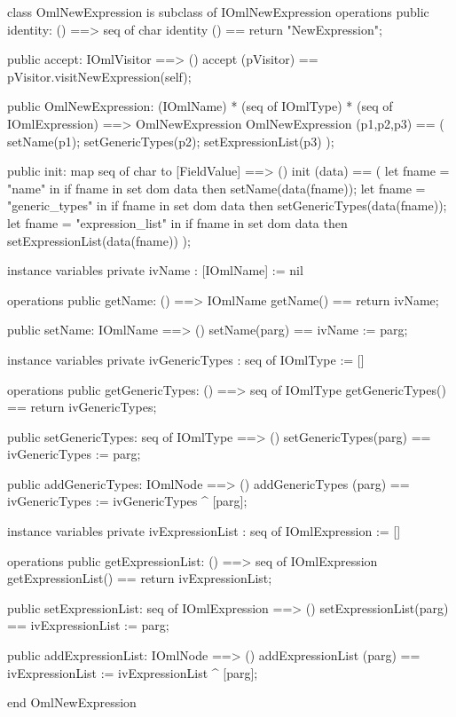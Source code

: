 \begin{vdm_al}
class OmlNewExpression is subclass of IOmlNewExpression
operations
  public identity: () ==> seq of char
  identity () == return "NewExpression";

  public accept: IOmlVisitor ==> ()
  accept (pVisitor) == pVisitor.visitNewExpression(self);

  public OmlNewExpression:
      (IOmlName) *
      (seq of IOmlType) *
      (seq of IOmlExpression) ==> OmlNewExpression
  OmlNewExpression (p1,p2,p3) == 
   ( setName(p1);
     setGenericTypes(p2);
     setExpressionList(p3) );

  public init: map seq of char to [FieldValue] ==> ()
  init (data) ==
    ( let fname = "name" in
        if fname in set dom data
        then setName(data(fname));
      let fname = "generic_types" in
        if fname in set dom data
        then setGenericTypes(data(fname));
      let fname = "expression_list" in
        if fname in set dom data
        then setExpressionList(data(fname)) );

instance variables
  private ivName : [IOmlName] := nil

operations
  public getName: () ==> IOmlName
  getName() == return ivName;

  public setName: IOmlName ==> ()
  setName(parg) == ivName := parg;

instance variables
  private ivGenericTypes : seq of IOmlType := []

operations
  public getGenericTypes: () ==> seq of IOmlType
  getGenericTypes() == return ivGenericTypes;

  public setGenericTypes: seq of IOmlType ==> ()
  setGenericTypes(parg) == ivGenericTypes := parg;

  public addGenericTypes: IOmlNode ==> ()
  addGenericTypes (parg) == ivGenericTypes := ivGenericTypes ^ [parg];

instance variables
  private ivExpressionList : seq of IOmlExpression := []

operations
  public getExpressionList: () ==> seq of IOmlExpression
  getExpressionList() == return ivExpressionList;

  public setExpressionList: seq of IOmlExpression ==> ()
  setExpressionList(parg) == ivExpressionList := parg;

  public addExpressionList: IOmlNode ==> ()
  addExpressionList (parg) == ivExpressionList := ivExpressionList ^ [parg];

end OmlNewExpression
\end{vdm_al}

